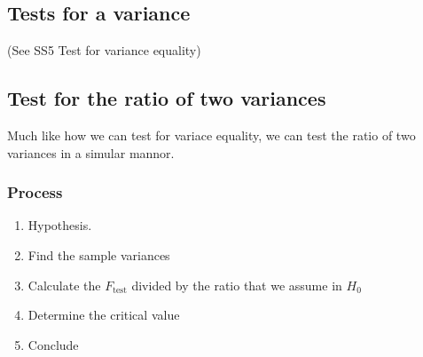     \subsection{Tests for a variance}
        (See SS5 Test for variance equality)

    \subsection{Test for the ratio of two variances}
        Much like how we can test for variace equality, we can test the ratio of two variances in a simular mannor.

        \subsubsection{Process}
            \begin{enumerate}
            \item Hypothesis.
            \item Find the sample variances
            \item Calculate the $F_{\text{test}}$ divided by the ratio that we assume in $H_0$
            \item Determine the critical value
            \item Conclude
            \end{enumerate}

